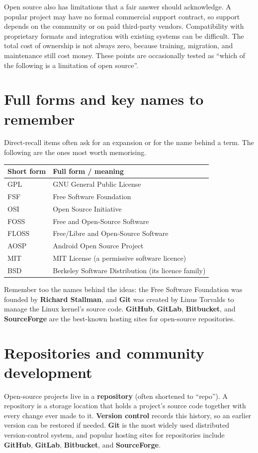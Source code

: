 \documentclass[11pt]{article}
\begin{document}
Open source also has limitations that a fair answer should acknowledge. A
popular project may have no formal commercial support contract, so support
depends on the community or on paid third-party vendors. Compatibility with
proprietary formats and integration with existing systems can be difficult.
The total cost of ownership is not always zero, because training, migration,
and maintenance still cost money. These points are occasionally tested as
``which of the following is a limitation of open source''.

\section{Full forms and key names to remember}
Direct-recall items often ask for an expansion or for the name behind a term.
The following are the ones most worth memorising.

\begin{center}
\begin{tabular}{p{}p{}}
\toprule
\textbf{Short form} & \textbf{Full form / meaning} \\
\midrule
GPL & GNU General Public License \\
FSF & Free Software Foundation \\
OSI & Open Source Initiative \\
FOSS & Free and Open-Source Software \\
FLOSS & Free/Libre and Open-Source Software \\
AOSP & Android Open Source Project \\
MIT & MIT License (a permissive software licence) \\
BSD & Berkeley Software Distribution (its licence family) \\
\bottomrule
\end{tabular}
\end{center}

Remember too the names behind the ideas: the Free Software Foundation was
founded by \textbf{Richard Stallman}, and \textbf{Git} was created by Linus
Torvalds to manage the Linux kernel's source code. \textbf{GitHub},
\textbf{GitLab}, \textbf{Bitbucket}, and \textbf{SourceForge} are the
best-known hosting sites for open-source repositories.

\section{Repositories and community development}
Open-source projects live in a \textbf{repository} (often shortened to
``repo''). A repository is a storage location that holds a project's source
code together with every change ever made to it. \textbf{Version control}
records this history, so an earlier version can be restored if needed.
\textbf{Git} is the most widely used distributed version-control system, and
popular hosting sites for repositories include \textbf{GitHub}, \textbf{GitLab},
\textbf{Bitbucket}, and \textbf{SourceForge}.
\end{document}
